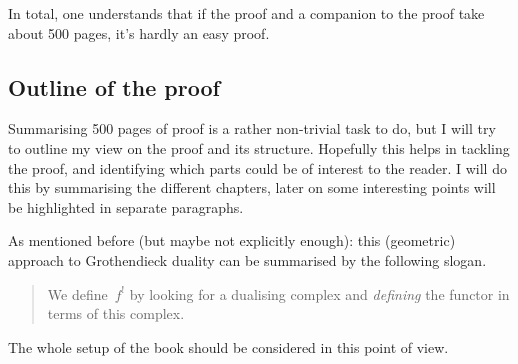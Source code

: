 In total, one understands that if the proof and a companion to the proof take about 500 pages, it's hardly an easy proof.

\subsection{Outline of the proof}
Summarising 500 pages of proof is a rather non-trivial task to do, but I will try to outline my view on the proof and its structure. Hopefully this helps in tackling the proof, and identifying which parts could be of interest to the reader. I will do this by summarising the different chapters, later on some interesting points will be highlighted in separate paragraphs.

As mentioned before (but maybe not explicitly enough): this (geometric) approach to Grothendieck duality can be summarised by the following slogan.
\begin{quote}
  We define~$f^!$ by looking for a dualising complex and \emph{defining} the functor in terms of this complex.
\end{quote}
The whole setup of the book should be considered in this point of view.

